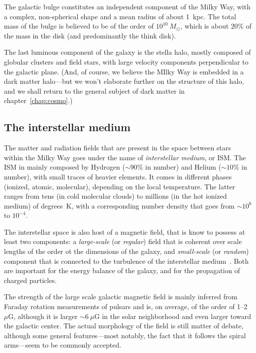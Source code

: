 The galactic bulge constitutes an independent component of the Milky Way, with a
complex, non-spherical shape and a mean radius of about 1~kpc. The total mass of the
bulge is believed to be of the order of $10^{10}~M_\odot$, which is about $20\%$ of
the mass in the disk (and predominantly the think disk).

The last luminous component of the galaxy is the stella halo, mostly composed of
globular clusters and field stars, with large velocity components perpendicular to the
galactic plane.
(And, of course, we believe the MIlky Way is embedded in a dark matter halo---but we
won't elaborate further on the structure of this halo, and we shall return to the
general subject of dark matter in chapter~\ref{chap:cosmo}.)


\subsection{The interstellar medium}
\label{sec:ism}

The matter and radiation fields that are present in the space between stars within
the Milky Way goes under the name of \emph{interstellar medium}, or
ISM.
The ISM in mainly composed by Hydrogen ($\sim 90\%$ in number) and Helium
($\sim 10\%$ in number), with small traces of heavier elements. It comes in different phases (ionized, atomic, molecular), depending
on the local temperature. The latter ranges from tens (in cold molecular clouds)
to millions (in the hot ionized medium) of degrees~K, with a corresponding number
density that goes from $\sim 10^6$ to $10^{-4}$.

The interstellar space is also host of a magnetic field, that is know to possess
at least two components: a \emph{large-scale} (or \emph{regular}) field that is
coherent over scale lengths of the order ot the dimensions of the galaxy, and
\emph{small-scale} (or \emph{random}) component that is connected to the turbulence
of the interstellar medium~\cite{Haverkorn2015}. Both are important for the energy
balance of the galaxy, and for the propagation of charged particles.

The strength of the large scale galactic magnetic field is mainly inferred from
Faraday rotation measurements of pulsars and is, on average, of the order of 1--2~$\mu$G,
although it is larger $\sim 6~\mu$G in the solar neighborhood and even larger toward
the galactic center. The actual morphology of the field is still matter of debate,
although some general features---most notably, the fact that it follows the spiral
arms---seem to be commonly accepted.

